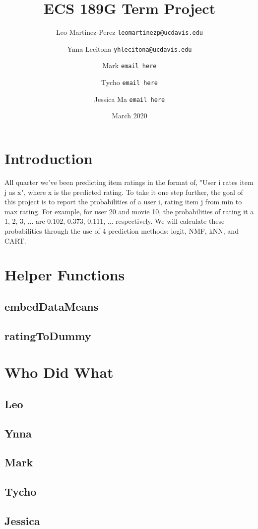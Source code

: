 \documentclass{article}
\title{ECS 189G Term Project}
\author{Leo Martinez-Perez
    \texttt{leomartinezp@ucdavis.edu}
    \and Ynna Lecitona
    \texttt{yhlecitona@ucdavis.edu}
    \and Mark
    \texttt{email here}
    \and Tycho
    \texttt{email here}
    \and Jessica Ma
    \texttt{email here}
}
\date{March 2020}
\begin{document}
\maketitle

\section{Introduction}
All quarter we've been predicting item ratings in the format of, "User i rates item j as x", where x is the predicted rating. To take it one step further, the goal of this project is to report the probabilities of a user i, rating item j from min to max rating. For example, for user 20 and movie 10, the probabilities of rating it a 1, 2, 3, ... are 0.102, 0.373, 0.111, ... respectively. We will calculate these probabilities through the use of 4 prediction methods: logit, NMF, kNN, and CART.

\section{Helper Functions}
\subsection{embedDataMeans}

\subsection{ratingToDummy}

\section{Who Did What}
\subsection{Leo}

\subsection{Ynna}

\subsection{Mark}

\subsection{Tycho}

\subsection{Jessica}
\end{document}
